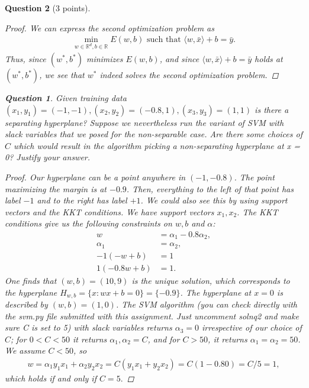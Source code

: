 \documentclass[12pt]{article}
\newcommand{\real}{\mathbb{R}}
\newcommand\set[1]{\{#1\}}
\newtheorem{question}{Question}
\begin{document}
\begin{question}[3 points]
\begin{proof}
    We can express the second optimization problem as
    \begin{align*}
      \min\limits_{w \in \real^d, b \in \real} E(w,b) \text{ such that } \langle w, \bar{x} \rangle + b = \bar{y}.
    \end{align*}
    Thus, since $(w^*, b^*)$ minimizes $E(w,b)$, and since $\langle w, \bar{x} \rangle + b = \bar{y}$ holds at $(w^*, b^*)$, we see that $w^*$ indeed solves the second optimization problem.
  \end{proof}
  \begin{question}
    Given training data $(x_1, y_1) = (-1, -1), (x_2, y_2) = (-0.8, 1), (x_3, y_3) = (1,1)$ is there a separating hyperplane? Suppose we nevertheless run the variant of SVM with slack variables that we posed for the non-separable case. Are there some choices of $C$ which would result in the algorithm picking a non-separating hyperplane at x = 0? Justify your answer.
    
  \end{question}
  \begin{proof}
    Our hyperplane can be a point anywhere in $(-1, -0.8)$. The point maximizing the margin is at $-0.9$. Then, everything to the left of that point has label $-1$ and to the right has label $+1$. We could also see this by using support vectors and the KKT conditions. We have support vectors $x_1, x_2$. The KKT conditions give us the following constraints on $w,b$ and $\alpha$:
    \begin{align*}
      w &= \alpha_1 - 0.8\alpha_2, \\
      \alpha_1 &= \alpha_2, \\
      -1(-w + b) &= 1 \\
      1(-0.8w + b) &= 1 .
    \end{align*}
    One finds that $(w,b)=(10,9)$ is the unique solution, which corresponds to the hyperplane $H_{w,b} = \set{x: wx+b = 0} = \set{-0.9}$.
    \bigbreak
    The hyperplane at $x=0$ is described by $(w,b) = (1,0)$. The SVM algorithm (you can check directly with the svm.py file submitted with this assignment. Just uncomment solnq2 and make sure C is set to 5) with slack variables returns $\alpha_3=0$ irrespective of our choice of $C$; for $0<C<50$ it returns $ \alpha_1, \alpha_2 = C$, and for  $C > 50$, it returns $ \alpha_1= \alpha_2 = 50$. We assume $C<50$, so
    \begin{align*}
      w = \alpha_1 y_1 x_1 + \alpha_2 y_2 x_2 = C( y_1x_1 + y_2x_2) = C( 1 - 0.80) = C/5 = 1,
    \end{align*}
    which holds if and only if $C=5.$
 
  \end{proof}
\end{question}
\end{document}
